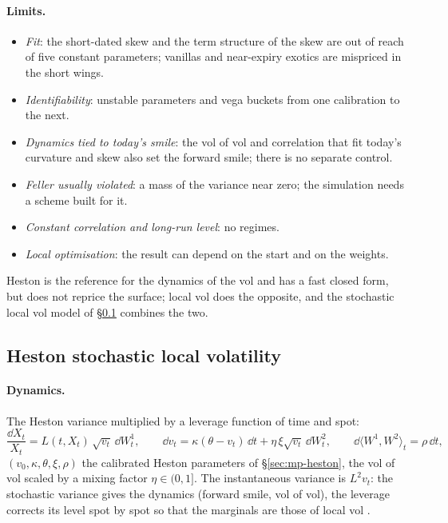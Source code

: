 \paragraph{Limits.}
\begin{itemize}[nosep]
  \item \emph{Fit}: the short-dated skew and the term structure of the skew are out of reach of five constant parameters;
        vanillas and near-expiry exotics are mispriced in the short wings.
  \item \emph{Identifiability}: unstable parameters and vega buckets from one calibration to the next.
  \item \emph{Dynamics tied to today's smile}: the vol of vol and correlation that fit today's curvature and skew also set
        the forward smile; there is no separate control.
  \item \emph{Feller usually violated}: a mass of the variance near zero; the simulation needs a scheme built for it.
  \item \emph{Constant correlation and long-run level}: no regimes.
  \item \emph{Local optimisation}: the result can depend on the start and on the weights.
\end{itemize}
Heston is the reference for the dynamics of the vol and has a fast closed form, but does not reprice the surface; local
vol does the opposite, and the stochastic local vol model of \S\ref{sec:mp-slv} combines the two.

\subsection{Heston stochastic local volatility}\label{sec:mp-slv}
\paragraph{Dynamics.} The Heston variance multiplied by a leverage function of time and spot:
\[
  \frac{\dd X_t}{X_t} = L(t, X_t)\,\sqrt{v_t}\,\dd W^1_t,\qquad
  \dd v_t = \kappa(\theta - v_t)\,\dd t + \eta\,\xi\sqrt{v_t}\,\dd W^2_t,\qquad \dd\langle W^1, W^2\rangle_t = \rho\,\dd t ,
\]
$(v_0, \kappa, \theta, \xi, \rho)$ the calibrated Heston parameters of \S\ref{sec:mp-heston}, the vol of vol scaled by a mixing factor
$\eta \in (0, 1]$. The instantaneous variance is $L^2 v_t$: the stochastic variance gives the dynamics (forward smile, vol of
vol), the leverage corrects its level spot by spot so that the marginals are those of local vol
\citep[][sec.~10.2]{vanderstoep2014,oosterlee2019}.

